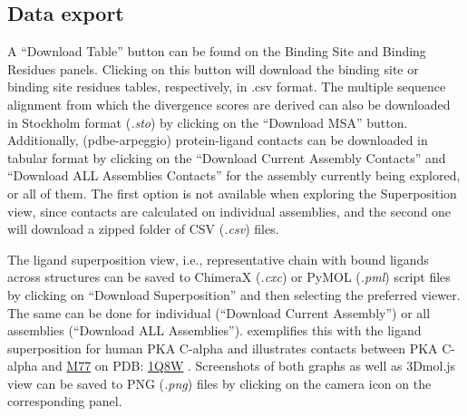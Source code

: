 \subsection{Data export}

A ``Download Table'' button can be found on the Binding Site and Binding Residues panels. Clicking on this button will download the binding site or binding site residues tables, respectively, in .csv format. The multiple sequence alignment from which the divergence scores are derived can also be downloaded in Stockholm format (\textit{.sto}) by clicking on the ``Download MSA'' button. Additionally, (pdbe-arpeggio) protein-ligand contacts can be downloaded in tabular format by clicking on the ``Download Current Assembly Contacts'' and ``Download ALL Assemblies Contacts'' for the assembly currently being explored, or all of them. The first option is not available when exploring the Superposition view, since contacts are calculated on individual assemblies, and the second one will download a zipped folder of CSV (\textit{.csv}) files.

The ligand superposition view, i.e., representative chain with bound ligands across structures can be saved to ChimeraX (\textit{.cxc}) or PyMOL (\textit{.pml}) script files by clicking on ``Download Superposition'' and then selecting the preferred viewer. The same can be done for individual (``Download Current Assembly'') or all assemblies (``Download ALL Assemblies'').  exemplifies this with the ligand superposition for human PKA C-alpha and  illustrates contacts between PKA C-alpha and \href{https://www.ebi.ac.uk/pdbe-srv/pdbechem/chemicalCompound/show/M77}{M77} on PDB: \href{https://www.ebi.ac.uk/pdbe/entry/pdb/1q8w}{1Q8W} \cite{BREITENLECHNER_2003_PKA}. Screenshots of both graphs as well as 3Dmol.js view can be saved to PNG (\textit{.png}) files by clicking on the camera icon on the corresponding panel.

